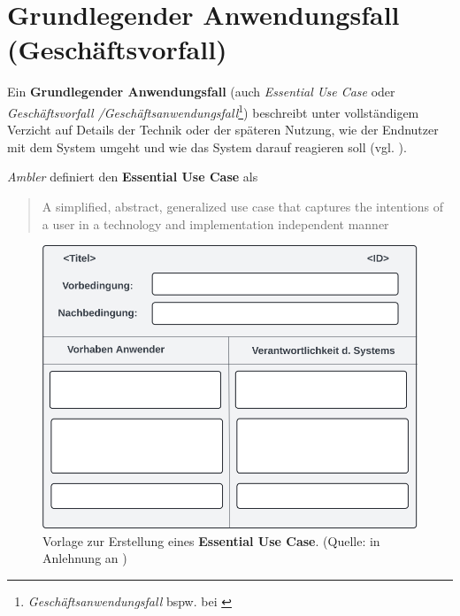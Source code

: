 \section{Grundlegender Anwendungsfall (Geschäftsvorfall)}

\begin{tcolorbox}
    Ein \textbf{Grundlegender Anwendungsfall} (auch \textit{Essential Use Case} oder \textit{Geschäftsvorfall /Geschäftsanwendungsfall}\footnote{
        \textit{Geschäftsanwendungsfall} bspw. bei \cite[101]{Oes05}
    }) beschreibt unter vollständigem Verzicht auf Details der Technik oder der späteren Nutzung, wie der Endnutzer mit dem System umgeht und wie das System darauf reagieren soll (vgl. \cite[68]{Wed09}).
\end{tcolorbox}

\textit{Ambler} definiert den \textbf{Essential Use Case} als
\blockquote[{\cite[184]{Amb04}}]{
    A simplified, abstract, generalized use case that captures the intentions of a user
    in a technology and implementation independent manner
}


\begin{figure}
    \centering
    \includegraphics[scale=0.3]{chapters/Anhang/CheatSheets/img/essentialusecasetemplate}
    \caption{Vorlage zur Erstellung eines \textbf{Essential Use Case}. (Quelle: in Anlehnung an \cite[Figure 2]{CL01})}
    \label{fig:essentialusecasetemplate}
\end{figure}